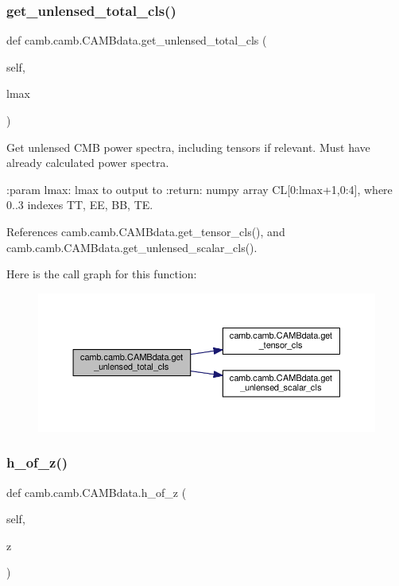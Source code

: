 \subsubsection{\texorpdfstring{get\+\_\+unlensed\+\_\+total\+\_\+cls()}{get\_unlensed\_total\_cls()}}
{\footnotesize\ttfamily def camb.\+camb.\+C\+A\+M\+Bdata.\+get\+\_\+unlensed\+\_\+total\+\_\+cls (\begin{DoxyParamCaption}\item[{}]{self,  }\item[{}]{lmax }\end{DoxyParamCaption})}

\begin{DoxyVerb}Get unlensed CMB power spectra, including tensors if relevant. Must have already calculated power spectra.

:param lmax: lmax to output to
:return: numpy array CL[0:lmax+1,0:4], where 0..3 indexes TT, EE, BB, TE.
\end{DoxyVerb}
 

References camb.\+camb.\+C\+A\+M\+Bdata.\+get\+\_\+tensor\+\_\+cls(), and camb.\+camb.\+C\+A\+M\+Bdata.\+get\+\_\+unlensed\+\_\+scalar\+\_\+cls().

Here is the call graph for this function\+:
\nopagebreak
\begin{figure}[H]
\begin{center}
\leavevmode
\includegraphics[width=350pt]{classcamb_1_1camb_1_1CAMBdata_a44fa4354fe9d41ca6b275e078c17d983_cgraph}
\end{center}
\end{figure}
\mbox{\label{classcamb_1_1camb_1_1CAMBdata_a19e14cac73b780bba9087500f650d78c}} 
\subsubsection{\texorpdfstring{h\+\_\+of\+\_\+z()}{h\_of\_z()}}
{\footnotesize\ttfamily def camb.\+camb.\+C\+A\+M\+Bdata.\+h\+\_\+of\+\_\+z (\begin{DoxyParamCaption}\item[{}]{self,  }\item[{}]{z }\end{DoxyParamCaption})}

